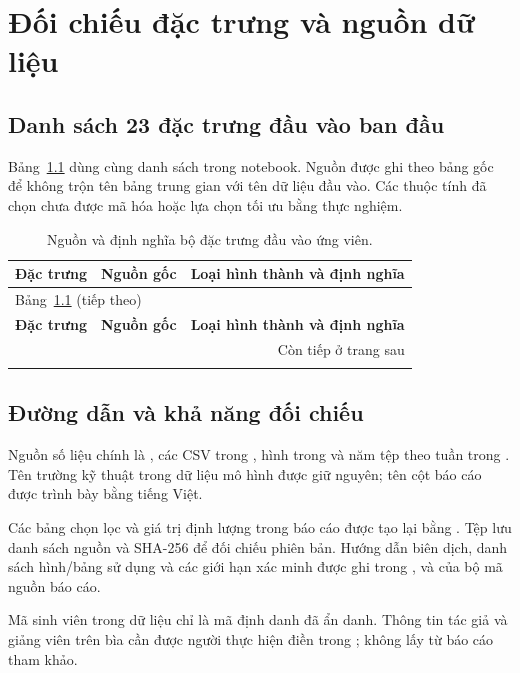 \chapter{Đối chiếu đặc trưng và nguồn dữ liệu}
\label{app:features}

\section{Danh sách 23 đặc trưng đầu vào ban đầu}
Bảng~\ref{tab:features} dùng cùng danh sách  trong notebook. Nguồn được ghi theo bảng gốc để không trộn tên bảng trung gian với tên dữ liệu đầu vào. Các thuộc tính đã chọn chưa được mã hóa hoặc lựa chọn tối ưu bằng thực nghiệm.

\begin{longtable}{@{}p{.25\linewidth}p{.20\linewidth}p{.49\linewidth}@{}}
\caption{Nguồn và định nghĩa bộ đặc trưng đầu vào ứng viên.}\label{tab:features}\\
\toprule
\textbf{Đặc trưng} & \textbf{Nguồn gốc} & \textbf{Loại hình thành và định nghĩa} \\
\midrule
\endfirsthead
\multicolumn{3}{l}{\small Bảng~\ref{tab:features} (tiếp theo)}\\
\toprule
\textbf{Đặc trưng} & \textbf{Nguồn gốc} & \textbf{Loại hình thành và định nghĩa} \\
\midrule
\endhead
\midrule
\multicolumn{3}{r}{\small Còn tiếp ở trang sau}\\
\endfoot
\bottomrule
\endlastfoot

\end{longtable}

\section{Đường dẫn và khả năng đối chiếu}
Nguồn số liệu chính là , các CSV trong , hình trong  và năm tệp theo tuần trong . Tên trường kỹ thuật trong dữ liệu mô hình được giữ nguyên; tên cột báo cáo được trình bày bằng tiếng Việt.

Các bảng chọn lọc và giá trị định lượng trong báo cáo được tạo lại bằng . Tệp  lưu danh sách nguồn và SHA-256 để đối chiếu phiên bản. Hướng dẫn biên dịch, danh sách hình/bảng sử dụng và các giới hạn xác minh được ghi trong ,  và  của bộ mã nguồn báo cáo.

Mã sinh viên trong dữ liệu chỉ là mã định danh đã ẩn danh. Thông tin tác giả và giảng viên trên bìa cần được người thực hiện điền trong ; không lấy từ báo cáo tham khảo.
